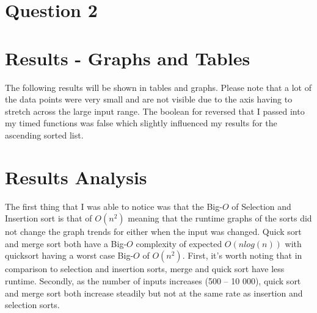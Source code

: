 \documentclass[oneside, a4paper]{article}
\begin{document}


\pagestyle{fancy}
\fancyhf{}


\newpage

\setcounter{secnumdepth}{-1}
\section{Question 2}

\section{Results - Graphs and Tables}
The following results will be shown in tables and graphs. Please note that a lot of the data points were very small and are not visible due to the axis having to stretch across the large input range. The boolean for reversed that I passed into my timed functions was false which slightly influenced my results for the ascending sorted list.


\newpage


\newpage



\newpage
\section{Results Analysis}
The first thing that I was able to notice was that the Big-$O$ of Selection and Insertion sort is that of $O(n^2)$ meaning that the runtime graphs of the sorts did not change the graph trends for either when the input was changed. Quick sort and merge sort both have a Big-$O$ complexity of expected $O(nlog(n))$ with quicksort having a worst case Big-$O$ of $O(n^2)$. First, it’s worth noting that in comparison to selection and insertion sorts, merge and quick sort have less runtime. Secondly, as the number of inputs increases (500 – 10 000), quick sort and merge sort both increase steadily but not at the same rate as insertion and selection sorts. 
\end{document}
